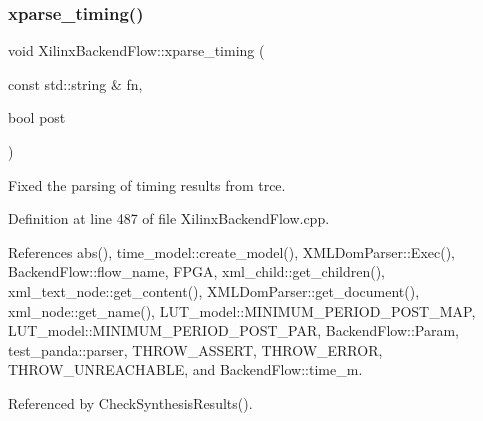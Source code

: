 \subsubsection{\texorpdfstring{xparse\+\_\+timing()}{xparse\_timing()}}
{\footnotesize\ttfamily void Xilinx\+Backend\+Flow\+::xparse\+\_\+timing (\begin{DoxyParamCaption}\item[{const std\+::string \&}]{fn,  }\item[{bool}]{post }\end{DoxyParamCaption})\hspace{0.3cm}{\ttfamily [protected]}}



Fixed the parsing of timing results from trce. 



Definition at line 487 of file Xilinx\+Backend\+Flow.\+cpp.



References abs(), time\+\_\+model\+::create\+\_\+model(), X\+M\+L\+Dom\+Parser\+::\+Exec(), Backend\+Flow\+::flow\+\_\+name, F\+P\+GA, xml\+\_\+child\+::get\+\_\+children(), xml\+\_\+text\+\_\+node\+::get\+\_\+content(), X\+M\+L\+Dom\+Parser\+::get\+\_\+document(), xml\+\_\+node\+::get\+\_\+name(), L\+U\+T\+\_\+model\+::\+M\+I\+N\+I\+M\+U\+M\+\_\+\+P\+E\+R\+I\+O\+D\+\_\+\+P\+O\+S\+T\+\_\+\+M\+AP, L\+U\+T\+\_\+model\+::\+M\+I\+N\+I\+M\+U\+M\+\_\+\+P\+E\+R\+I\+O\+D\+\_\+\+P\+O\+S\+T\+\_\+\+P\+AR, Backend\+Flow\+::\+Param, test\+\_\+panda\+::parser, T\+H\+R\+O\+W\+\_\+\+A\+S\+S\+E\+RT, T\+H\+R\+O\+W\+\_\+\+E\+R\+R\+OR, T\+H\+R\+O\+W\+\_\+\+U\+N\+R\+E\+A\+C\+H\+A\+B\+LE, and Backend\+Flow\+::time\+\_\+m.



Referenced by Check\+Synthesis\+Results().

